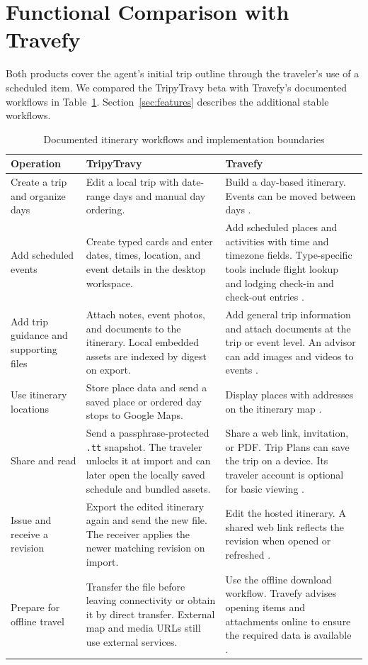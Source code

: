 \section{Functional Comparison with Travefy}
\label{sec:comparison}
Both products cover the agent's initial trip outline through the traveler's use of a scheduled item. We compared the TripyTravy beta with Travefy's documented workflows in Table~\ref{tab:features}. Section~\ref{sec:features} describes the additional stable workflows.

\begin{table}[t]
\caption{Documented itinerary workflows and implementation boundaries}
\label{tab:features}
\centering
\small
\renewcommand{\arraystretch}{1.16}
\begin{tabularx}{\textwidth}{@{}>{\raggedright\arraybackslash}p{}*{2}{>{\raggedright\arraybackslash}X}@{}}
\toprule
Operation & TripyTravy & Travefy \\
\midrule
Create a trip and organize days &
Edit a local trip with date-range days and manual day ordering. &
Build a day-based itinerary. Events can be moved between days \cite{travefybuilder,travefymove}. \\
Add scheduled events &
Create typed cards and enter dates, times, location, and event details in the desktop workspace. &
Add scheduled places and activities with time and timezone fields. Type-specific tools include flight lookup and lodging check-in and check-out entries \cite{travefytime,travefyflight,travefylodging}. \\
Add trip guidance and supporting files &
Attach notes, event photos, and documents to the itinerary. Local embedded assets are indexed by digest on export. &
Add general trip information and attach documents at the trip or event level. An advisor can add images and videos to events \cite{travefyinfo,travefyfiles,travefymedia}. \\
Use itinerary locations &
Store place data and send a saved place or ordered day stops to Google Maps. &
Display places with addresses on the itinerary map \cite{travefymap}. \\
Share and read &
Send a passphrase-protected \texttt{.tt} snapshot. The traveler unlocks it at import and can later open the locally saved schedule and bundled assets. &
Share a web link, invitation, or PDF. Trip Plans can save the trip on a device. Its traveler account is optional for basic viewing \cite{travefyshare,travefyapp}. \\
Issue and receive a revision &
Export the edited itinerary again and send the new file. The receiver applies the newer matching revision on import. &
Edit the hosted itinerary. A shared web link reflects the revision when opened or refreshed \cite{travefyupdates}. \\
Prepare for offline travel &
Transfer the file before leaving connectivity or obtain it by direct transfer. External map and media URLs still use external services. &
Use the offline download workflow. Travefy advises opening items and attachments online to ensure the required data is available \cite{travefyoffline}. \\
\bottomrule
\end{tabularx}
\end{table}


